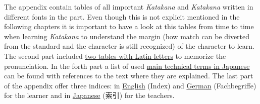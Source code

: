 The appendix contain tables of all important \textit{Katakana} and
\textit{Katakana} written in different fonts in the
 part. Even though this is not explicit mentioned
in the following chapters it is important to have a look at this tables from
time to time when learning \textit{Katakana} to understand the margin (how
match can be diverted from the standard and the character is still recognized)
of the character to learn. The second part included
\hyperref[chap:RomajiTables]{two tables with Latin letters} to memorize the
pronunciation. In the forth part a list of used
\hyperref[chap:ListOfJapaneseTechnicalTerms]{main technical terms in Japanese}
can be found with references to the text where they are explained.  The last
part of the appendix offer three indices: in
\hyperref[chap:EnglishIndex]{English} (Index) and
\hyperref[chap:GermanIndex]{German} (Fachbegriffe) for the learner and in
\hyperref[chap:JapaneseIndex]{Japanese} (索引) for the teachers. 




